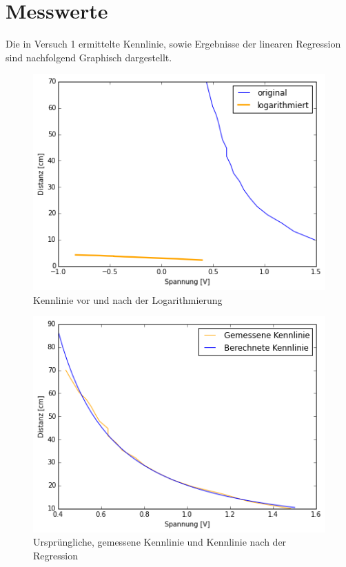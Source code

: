 \documentclass[12pt,oneside,a4paper]{report}
\begin{document}

\section{Messwerte}
\label{chap:VERSUCH_2_MESSWERTE}
Die in Versuch 1 ermittelte Kennlinie, sowie Ergebnisse der linearen Regression sind nachfolgend Graphisch dargestellt.
\begin{figure}
\centering\small
\includegraphics[scale=0.8]{src/Kennlinie2.png}
\caption{Kennlinie vor und nach der Logarithmierung}
\label{fig:KENNLINIE_LOG_ORIG}
\end{figure}
\begin{figure}
\centering\small
\includegraphics[scale=0.8]{src/Kennlinie1.png}
\caption{Ursprüngliche, gemessene Kennlinie und Kennlinie nach der Regression}
\label{fig:KENNLINIE_FINAL}
\end{figure}
\end{document}
